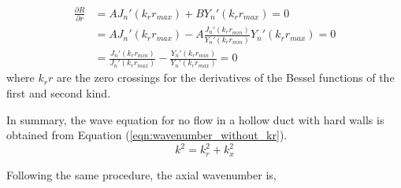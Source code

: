 \begin{align*} 
    \frac{ \partial R}{\partial r} &= AJ_n'(k_r r_{max}) + B Y_n' (k_r r_{max}) = 0 \\
                                   &= AJ_n'(k_r r_{max}) - A\frac{J_n' (k_r r_{min})}{Y_n'(k_r r_{min})} Y_n' (k_r r_{max}) = 0 \\
                                   &= \frac{J_n'(k_r r_{min})}{J_n' (k_r r_{max})} - \frac{Y_n'(k_r r_{min})}{Y_n' (k_r r_{max})} = 0 
\end{align*}
where $k_r r$ are the zero crossings for the derivatives of the Bessel functions of the first and second kind.

In summary, the wave equation for no flow in a hollow duct with hard walls is obtained 
from Equation (\ref{eqn:wavenumber_without_kr}).
\begin{equation}
    k^2 = k_r^2 + k_x^2
    \label{eqn:wavenumber_equation}
\end{equation}


Following the same procedure, the axial wavenumber is,






